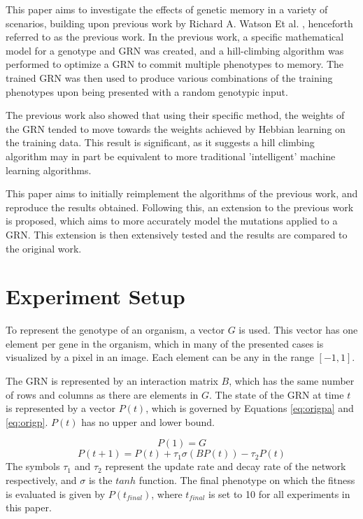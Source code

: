 \documentclass[twocolumn,a4paper,11pt]{article}
\begin{document}
    This paper aims to investigate the effects of genetic memory in a variety of scenarios, building upon previous work by Richard A. Watson Et al. \cite{original-paper}, henceforth referred to as the previous work. In the previous work, a specific mathematical model for a genotype and GRN was created, and a hill-climbing algorithm was performed to optimize a GRN to commit multiple phenotypes to memory. The trained GRN was then used to produce various combinations of the training phenotypes upon being presented with a random genotypic input.

    The previous work also showed that using their specific method, the weights of the GRN tended to move towards the weights achieved by Hebbian learning on the training data. This result is significant, as it suggests a hill climbing algorithm may in part be equivalent to more traditional 'intelligent' machine learning algorithms.

    This paper aims to initially reimplement the algorithms of the previous work, and reproduce the results obtained. Following this, an extension to the previous work is proposed, which aims to more accurately model the mutations applied to a GRN. This extension is then extensively tested and the results are compared to the original work.

    \section{Experiment Setup}
    To represent the genotype of an organism, a vector $G$ is used. This vector has one element per gene in the organism, which in many of the presented cases is visualized by a pixel in an image. Each element can be any in the range $[-1,1]$.

    The GRN is represented by an interaction matrix $B$, which has the same number of rows and columns as there are elements in $G$. The state of the GRN at time $t$ is represented by a vector $P(t)$, which is governed by Equations \ref{eq:origpa} and \ref{eq:origp}. $P(t)$ has no upper and lower bound.
    
    \begin{equation} \label{eq:origpa}
        P(1) = G
    \end{equation}
    \begin{equation} \label{eq:origp}
        P(t+1) = P(t) + \tau_1 \sigma (B P(t)) - \tau_2 P(t)
    \end{equation}
    The symbols $\tau_1$ and $\tau_2$ represent the update rate and decay rate of the network respectively, and $\sigma$ is the $tanh$ function. The final phenotype on which the fitness is evaluated is given by $P(t_{final})$, where $t_{final}$ is set to 10 for all experiments in this paper.
\end{document}

